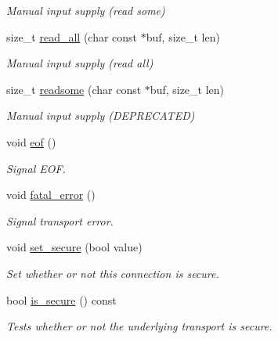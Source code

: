 \begin{DoxyCompactItemize}
\begin{DoxyCompactList}\small\item\em Manual input supply (read some) \end{DoxyCompactList}\item 
size\+\_\+t \mbox{\hyperlink{classwebsocketpp_1_1transport_1_1iostream_1_1connection_a4a492425587bf02f557d8f03b8be8dc8}{read\+\_\+all}} (char const $\ast$buf, size\+\_\+t len)
\begin{DoxyCompactList}\small\item\em Manual input supply (read all) \end{DoxyCompactList}\item 
size\+\_\+t \mbox{\hyperlink{classwebsocketpp_1_1transport_1_1iostream_1_1connection_a72f532fb0a8d339371b8ca112fdd3f66}{readsome}} (char const $\ast$buf, size\+\_\+t len)
\begin{DoxyCompactList}\small\item\em Manual input supply (D\+E\+P\+R\+E\+C\+A\+T\+ED) \end{DoxyCompactList}\item 
void \mbox{\hyperlink{classwebsocketpp_1_1transport_1_1iostream_1_1connection_a88529f4130f75beed493c84c861e66cf}{eof}} ()
\begin{DoxyCompactList}\small\item\em Signal E\+OF. \end{DoxyCompactList}\item 
void \mbox{\hyperlink{classwebsocketpp_1_1transport_1_1iostream_1_1connection_a3fdd2b1f005daafa73bffe45063a7750}{fatal\+\_\+error}} ()
\begin{DoxyCompactList}\small\item\em Signal transport error. \end{DoxyCompactList}\item 
void \mbox{\hyperlink{classwebsocketpp_1_1transport_1_1iostream_1_1connection_a34443f9921e85115607304397d43cc8f}{set\+\_\+secure}} (bool value)
\begin{DoxyCompactList}\small\item\em Set whether or not this connection is secure. \end{DoxyCompactList}\item 
bool \mbox{\hyperlink{classwebsocketpp_1_1transport_1_1iostream_1_1connection_aae6fa1869211e9dc8a18d609292bd833}{is\+\_\+secure}} () const
\begin{DoxyCompactList}\small\item\em Tests whether or not the underlying transport is secure. \end{DoxyCompactList}\item 

\end{DoxyCompactItemize}
